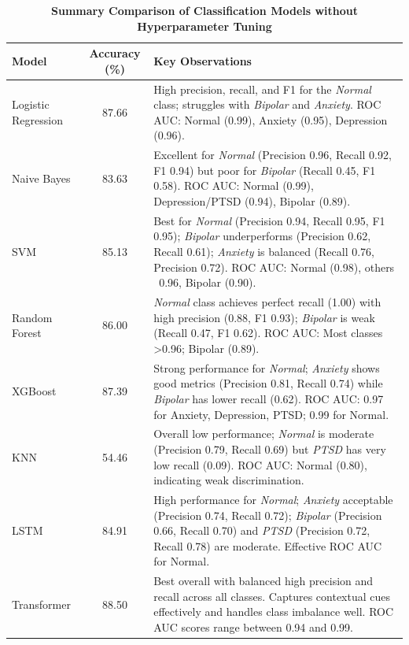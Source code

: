 \pagebreak

\begin{table}[H]
    \centering
    \renewcommand{\arraystretch}{1.2}
    \small
    \begin{tabularx}{\textwidth}{|l|c|X|}
    \hline
    \textbf{Model} & \textbf{Accuracy (\%)} & \textbf{Key Observations} \\
    \hline
    Logistic Regression & 87.66 & High precision, recall, and F1 for the \textit{Normal} class; struggles with \textit{Bipolar} and \textit{Anxiety}. ROC AUC: Normal (0.99), Anxiety (0.95), Depression (0.96). \\
    \hline
    Naive Bayes & 83.63 & Excellent for \textit{Normal} (Precision 0.96, Recall 0.92, F1 0.94) but poor for \textit{Bipolar} (Recall 0.45, F1 0.58). \newline ROC AUC: Normal (0.99), Depression/PTSD (0.94), Bipolar (0.89). \\
    \hline
    SVM & 85.13 & Best for \textit{Normal} (Precision 0.94, Recall 0.95, F1 0.95); \textit{Bipolar} underperforms (Precision 0.62, Recall 0.61); \textit{Anxiety} is balanced (Recall 0.76, Precision 0.72). \newline ROC AUC: Normal (0.98), others ~0.96, Bipolar (0.90). \\
    \hline
    Random Forest & 86.00 & \textit{Normal} class achieves perfect recall (1.00) with high precision (0.88, F1 0.93); \textit{Bipolar} is weak (Recall 0.47, F1 0.62). \newline ROC AUC: Most classes >0.96; Bipolar (0.89). \\
    \hline
    XGBoost & 87.39 & Strong performance for \textit{Normal}; \textit{Anxiety} shows good metrics (Precision 0.81, Recall 0.74) while \textit{Bipolar} has lower recall (0.62). \newline ROC AUC: 0.97 for Anxiety, Depression, PTSD; 0.99 for Normal. \\
    \hline
    KNN & 54.46 & Overall low performance; \textit{Normal} is moderate (Precision 0.79, Recall 0.69) but \textit{PTSD} has very low recall (0.09). \newline ROC AUC: Normal (0.80), indicating weak discrimination. \\
    \hline
    LSTM & 84.91 & High performance for \textit{Normal}; \textit{Anxiety} acceptable (Precision 0.74, Recall 0.72); \textit{Bipolar} (Precision 0.66, Recall 0.70) and \textit{PTSD} (Precision 0.72, Recall 0.78) are moderate. \newline Effective ROC AUC for Normal. \\
    \hline
    Transformer & 88.50 & Best overall with balanced high precision and recall across all classes. Captures contextual cues effectively and handles class imbalance well. \newline ROC AUC scores range between 0.94 and 0.99. \\
    \hline
    \end{tabularx}
    \caption*{\textbf{Summary Comparison of  Classification Models without Hyperparameter Tuning}}
    \label{tab:model_comparison}
\end{table}



